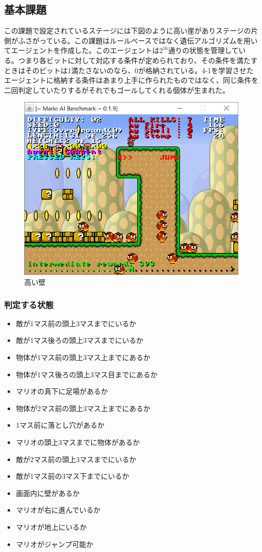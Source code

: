\documentclass{jsarticle}
\begin{document}
\subsection{基本課題}
この課題で設定されているステージには下図のように高い崖がありステージの片側がふさがっている。この課題はルールベースではなく遺伝アルゴリズムを用いてエージェントを作成した。このエージェントは$2^{16}$通りの状態を管理している。つまり各ビットに対して対応する条件が定められており、その条件を満たすときはそのビットは1満たさないのなら、0が格納されている。4-1を学習させたエージェントに格納する条件はあまり上手に作られたものではなく、同じ条件を二回判定していたりするがそれでもゴールしてくれる個体が生まれた。
\begin{figure}[H]
	\includegraphics{wall.png}
	\caption{高い壁}
\end{figure}
\subsubsection{判定する状態}
\begin{itemize}
	\item{敵が1マス前の頭上3マスまでにいるか}
	\item{敵が1マス後ろの頭上3マスまでにいるか}
	\item{物体が1マス前の頭上3マス上までにあるか}
	\item{物体が1マス後ろの頭上3マス目までにあるか}
	\item{マリオの真下に足場があるか}
	\item{物体が2マス前の頭上3マス上までにあるか}
	\item{1マス前に落とし穴があるか}
	\item{マリオの頭上3マスまでに物体があるか}
	\item{敵が2マス前の頭上3マスまでにいるか}
	\item{敵が1マス前の3マス下までにいるか}
	\item{画面内に壁があるか}
	\item{マリオが右に進んでいるか}
	\item{マリオが地上にいるか}
	\item{マリオがジャンプ可能か}
\end{itemize}
\end{document}
